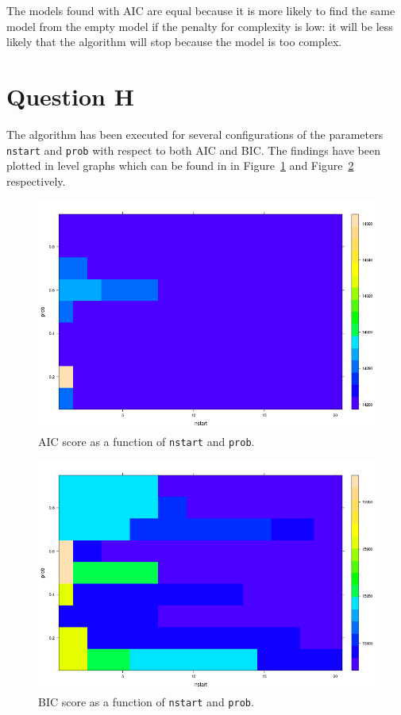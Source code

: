 \documentclass[12pt]{article}
\theoremstyle{definition}
\begin{document}
The models found with AIC are equal because it is more likely to find the
same model from the empty model if the penalty for complexity is low: it will
be less likely that the algorithm will stop because the model is too complex.

\section*{Question H}
The algorithm has been executed for several configurations of the parameters \texttt{nstart} and \texttt{prob} with respect to both AIC and BIC.
The findings have been plotted in level graphs which can be found in in Figure~\ref{fig:aic_plot} and Figure~\ref{fig:bic_plot} respectively.

\begin{figure}[H]
    \centering
    \includegraphics[width=0.8\linewidth]{aic_plot.png}
    \caption{AIC score as a function of \texttt{nstart} and \texttt{prob}.}
\label{fig:aic_plot}
\end{figure}

\begin{figure}[H]
    \centering
    \includegraphics[width=0.8\linewidth]{bic_plot.png}
    \caption{BIC score as a function of \texttt{nstart} and \texttt{prob}.}
\label{fig:bic_plot}
\end{figure}
\end{document}
